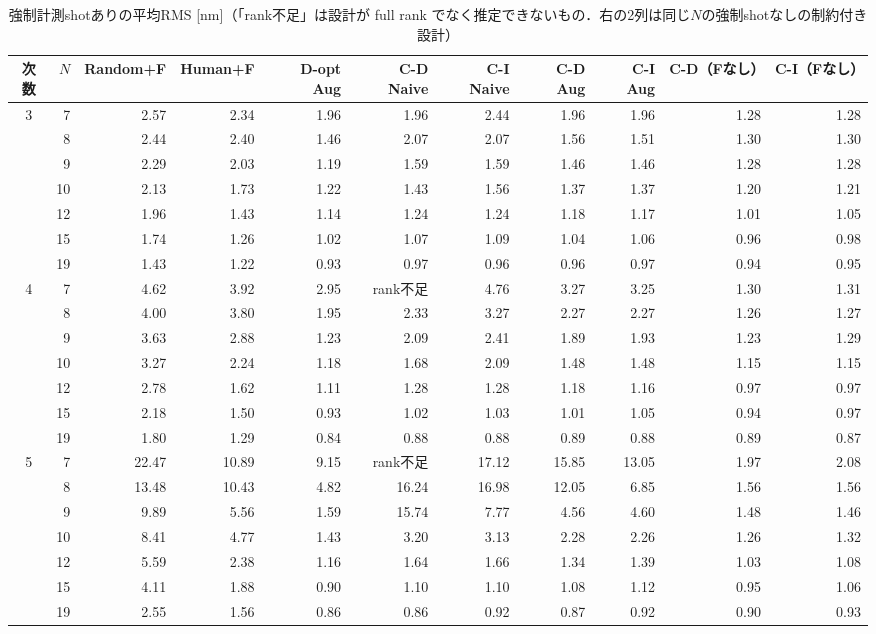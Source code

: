 \documentclass[10.5pt,a4paper]{ltjsarticle}
\begin{document}
\begin{table}[htbp]
  \centering
  \caption{強制計測shotありの平均RMS [nm]（「rank不足」は設計が full rank でなく推定できないもの．右の2列は同じ$N$の強制shotなしの制約付き設計）}
  \label{tab:mand}
  \scriptsize
  \setlength{\tabcolsep}{3.5pt}
\begin{tabular}{crrrrrrrrrr}
\toprule
次数 & $N$ & Random+F & Human+F & D-opt Aug & C-D Naive & C-I Naive & C-D Aug & C-I Aug & C-D（Fなし） & C-I（Fなし） \\
\midrule
\multirow{7}{*}{3} & 7 & 2.57 & 2.34 & 1.96 & 1.96 & 2.44 & 1.96 & 1.96 & 1.28 & 1.28 \\
 & 8 & 2.44 & 2.40 & 1.46 & 2.07 & 2.07 & 1.56 & 1.51 & 1.30 & 1.30 \\
 & 9 & 2.29 & 2.03 & 1.19 & 1.59 & 1.59 & 1.46 & 1.46 & 1.28 & 1.28 \\
 & 10 & 2.13 & 1.73 & 1.22 & 1.43 & 1.56 & 1.37 & 1.37 & 1.20 & 1.21 \\
 & 12 & 1.96 & 1.43 & 1.14 & 1.24 & 1.24 & 1.18 & 1.17 & 1.01 & 1.05 \\
 & 15 & 1.74 & 1.26 & 1.02 & 1.07 & 1.09 & 1.04 & 1.06 & 0.96 & 0.98 \\
 & 19 & 1.43 & 1.22 & 0.93 & 0.97 & 0.96 & 0.96 & 0.97 & 0.94 & 0.95 \\
\midrule
\multirow{7}{*}{4} & 7 & 4.62 & 3.92 & 2.95 & rank不足 & 4.76 & 3.27 & 3.25 & 1.30 & 1.31 \\
 & 8 & 4.00 & 3.80 & 1.95 & 2.33 & 3.27 & 2.27 & 2.27 & 1.26 & 1.27 \\
 & 9 & 3.63 & 2.88 & 1.23 & 2.09 & 2.41 & 1.89 & 1.93 & 1.23 & 1.29 \\
 & 10 & 3.27 & 2.24 & 1.18 & 1.68 & 2.09 & 1.48 & 1.48 & 1.15 & 1.15 \\
 & 12 & 2.78 & 1.62 & 1.11 & 1.28 & 1.28 & 1.18 & 1.16 & 0.97 & 0.97 \\
 & 15 & 2.18 & 1.50 & 0.93 & 1.02 & 1.03 & 1.01 & 1.05 & 0.94 & 0.97 \\
 & 19 & 1.80 & 1.29 & 0.84 & 0.88 & 0.88 & 0.89 & 0.88 & 0.89 & 0.87 \\
\midrule
\multirow{7}{*}{5} & 7 & 22.47 & 10.89 & 9.15 & rank不足 & 17.12 & 15.85 & 13.05 & 1.97 & 2.08 \\
 & 8 & 13.48 & 10.43 & 4.82 & 16.24 & 16.98 & 12.05 & 6.85 & 1.56 & 1.56 \\
 & 9 & 9.89 & 5.56 & 1.59 & 15.74 & 7.77 & 4.56 & 4.60 & 1.48 & 1.46 \\
 & 10 & 8.41 & 4.77 & 1.43 & 3.20 & 3.13 & 2.28 & 2.26 & 1.26 & 1.32 \\
 & 12 & 5.59 & 2.38 & 1.16 & 1.64 & 1.66 & 1.34 & 1.39 & 1.03 & 1.08 \\
 & 15 & 4.11 & 1.88 & 0.90 & 1.10 & 1.10 & 1.08 & 1.12 & 0.95 & 1.06 \\
 & 19 & 2.55 & 1.56 & 0.86 & 0.86 & 0.92 & 0.87 & 0.92 & 0.90 & 0.93 \\
\bottomrule
\end{tabular}
\end{table}
\end{document}
